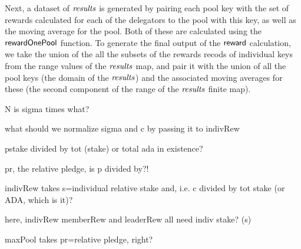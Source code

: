 Next, a dataset of $\mathit{results}$ is generated
by pairing each pool key with the set of rewards calculated for each of the delegators to
the pool with this key, as well as the moving average for the pool.
Both of these are calculated using the $\mathsf{rewardOnePool}$ function.
To generate the final output of the $\mathsf{reward}$ calculation,
we take the union of the all the subsets of the rewards recods of individual
keys from the range values of the $\mathit{results}$ map, and pair it with the
union of all the pool keys (the domain of the $\mathit{results}$) and the associated
moving averages for these (the second component of the range of the
$\mathit{results}$ finite map).

\begin{todo}
  N is sigma times what?

  what should we normalize sigma and c by passing it to indivRew

  pstake divided by tot (stake) or total ada in existence?

  pr, the relative pledge, is p divided by?!

  indivRew takes s=individual relative stake and, i.e. c divided by
  tot stake (or ADA, which is it)?

  here, indivRew memberRew and leaderRew all need indiv stake? (s)

  maxPool takes pr=relative pledge, right?
\end{todo}

